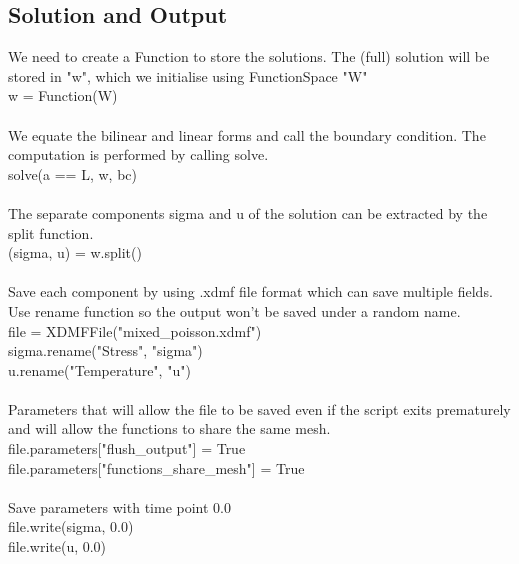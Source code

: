 \documentclass[12pt,3p]{article}
\begin{document}
\subsection{Solution and Output}
We need to create a {\selectfont Function} to store the solutions. The (full) solution will be stored in "w", which we initialise using FunctionSpace "W" \\
{\selectfont
w = Function(W) \\ \\
}
We equate the bilinear and linear forms and call the boundary condition. The computation is performed by calling {\selectfont solve}. \\
{\selectfont
solve(a == L, w, bc) \\ \\
}
The separate components {\selectfont sigma} and {\selectfont u} of the solution can be extracted by the {\selectfont split} function. \\
{\selectfont
(sigma, u) = w.split() \\ \\
}
Save each component by using .xdmf file format which can save multiple fields. Use {\selectfont rename } function so the output won't be saved under a random name. \\
{\selectfont
file = XDMFFile("mixed\_poisson.xdmf") \\
sigma.rename("Stress", "sigma") \\
u.rename("Temperature", "u") \\ \\
}
Parameters that will allow the file to be saved even if the script exits prematurely and will allow the functions to share the same mesh. \\
{\selectfont
file.parameters["flush\_output"] = True \\
file.parameters["functions\_share\_mesh"] = True \\ \\
}
Save parameters with time point 0.0\\
{\selectfont
file.write(sigma, 0.0) \\
file.write(u, 0.0) \\ \\
}
\end{document}
